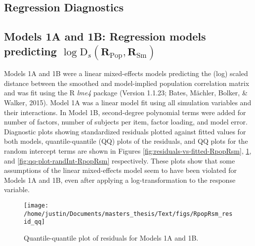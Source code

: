 \documentclass[
  english,
  man]{apa6}
\begin{document}
\begin{appendix}
\hypertarget{regression-diagnostics}{%
\section{Regression Diagnostics}\label{regression-diagnostics}}

\hypertarget{models-1a-and-1b-regression-models-predicting-log-textrmd_smathbfr_textrmpop-mathbfr_textrmsm}{%
\subsection{\texorpdfstring{Models 1A and 1B: Regression models
predicting
\(\log \textrm{D}_s(\mathbf{R}_{\textrm{Pop}}, \mathbf{R}_{\textrm{Sm}})\)}{Models 1A and 1B: Regression models predicting \textbackslash log \textbackslash textrm\{D\}\_s(\textbackslash mathbf\{R\}\_\{\textbackslash textrm\{Pop\}\}, \textbackslash mathbf\{R\}\_\{\textbackslash textrm\{Sm\}\})}}\label{models-1a-and-1b-regression-models-predicting-log-textrmd_smathbfr_textrmpop-mathbfr_textrmsm}}

Models 1A and 1B were a linear mixed-effects models predicting the (log)
scaled distance between the smoothed and model-implied population
correlation matrix and was fit using the R \emph{lme4} package (Version
1.1.23; Bates, Mächler, Bolker, \& Walker, 2015). Model 1A was a linear
model fit using all simulation variables and their interactions. In
Model 1B, second-degree polynomial terms were added for number of
factors, number of subjects per item, factor loading, and model error.
Diagnostic plots showing standardized residuals plotted against fitted
values for both models, quantile-quantile (QQ) plots of the residuals,
and QQ plots for the random intercept terms are shown in Figures
\ref{fig:residuals-vs-fitted-RpopRsm}, \ref{fig:qq-plot-RpopRsm}, and
\ref{fig:qq-plot-randInt-RpopRsm} respectively. These plots show that
some assumptions of the linear mixed-effects model seem to have been
violated for Models 1A and 1B, even after applying a log-transformation
to the response variable.

\begin{figure}

{\centering \texttt{[image: /home/justin/Documents/masters\_thesis/Text/figs/RpopRsm\_resid\_qq]} 

}

\caption{Quantile-quantile plot of residuals for Models 1A and 1B.}\label{fig:qq-plot-RpopRsm}
\end{figure}


\end{appendix}
\end{document}
